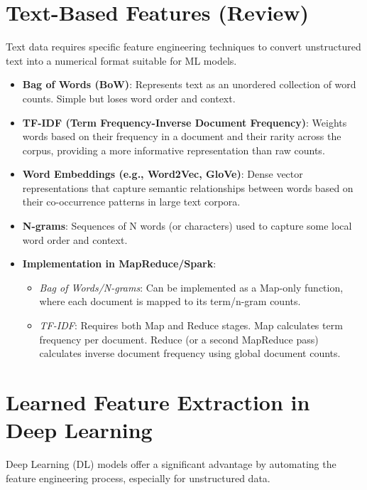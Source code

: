 \documentclass{article}
\begin{document}
\section*{Text-Based Features (Review)}
Text data requires specific feature engineering techniques to convert unstructured text into a numerical format suitable for ML models.

\begin{itemize}
    \item \textbf{Bag of Words (BoW)}: Represents text as an unordered collection of word counts. Simple but loses word order and context.
    \item \textbf{TF-IDF (Term Frequency-Inverse Document Frequency)}: Weights words based on their frequency in a document and their rarity across the corpus, providing a more informative representation than raw counts.
    \item \textbf{Word Embeddings (e.g., Word2Vec, GloVe)}: Dense vector representations that capture semantic relationships between words based on their co-occurrence patterns in large text corpora.
    \item \textbf{N-grams}: Sequences of N words (or characters) used to capture some local word order and context.
\item \textbf{Implementation in MapReduce/Spark}:
    \begin{itemize}
        \item \textit{Bag of Words/N-grams}: Can be implemented as a Map-only function, where each document is mapped to its term/n-gram counts.
        \item \textit{TF-IDF}: Requires both Map and Reduce stages. Map calculates term frequency per document. Reduce (or a second MapReduce pass) calculates inverse document frequency using global document counts.
    \end{itemize}
\end{itemize}

\section*{Learned Feature Extraction in Deep Learning}
Deep Learning (DL) models offer a significant advantage by automating the feature engineering process, especially for unstructured data.
\end{document}
